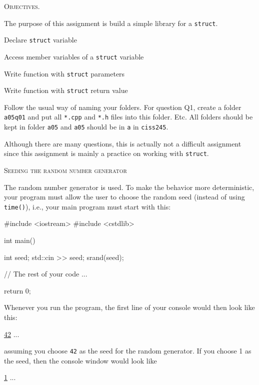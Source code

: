 


\renewcommand\TITLE{Assignment 5}


\topmatter

\textsc{Objectives.}
\begin{tightlist}
\item The purpose of this assignment is build a simple library for a
\texttt{struct}. 
\item Declare \texttt{struct} variable
\item Access member variables of a \texttt{struct} variable
\item Write function with \texttt{struct} parameters 
\item Write function with \texttt{struct} return value
\end{tightlist}

Follow the usual way of naming your folders.
For question Q1, create a folder \verb!a05q01! and put all 
\verb!*.cpp! and \verb!*.h! files into this folder.
Etc.
All folders should be kept in folder \verb!a05! and \verb!a05! should be
in \verb!a! in \verb!ciss245!.

Although there are many questions,
this is actually not a difficult assignment since this assignment is
mainly a practice on working with \texttt{struct}.


\newpage
\textsc{Seeding the random number generator}

The random number generator is used.
To make the behavior more deterministic, your program must allow the
user to choose the random seed (instead of using
\verb!time()!), i.e., your main program
must start with this:

\begin{console}[frame=single]
#include <iostream>
#include <cstdlib>

int main()
{
    int seed;
    std::cin >> seed;
    srand(seed);

    // The rest of your code ...
    
    return 0;
}
\end{console}

Whenever you run the program,
the first line of your console would then look
like this:
\begin{console}[commandchars=\\\{\}]
\underline{42}
...
\end{console}
assuming you choose \verb!42! as the seed for the random generator.
If you choose 1 as the seed, then the console window would look like
\begin{console}[commandchars=\\\{\}]
\underline{1}
...
\end{console}

